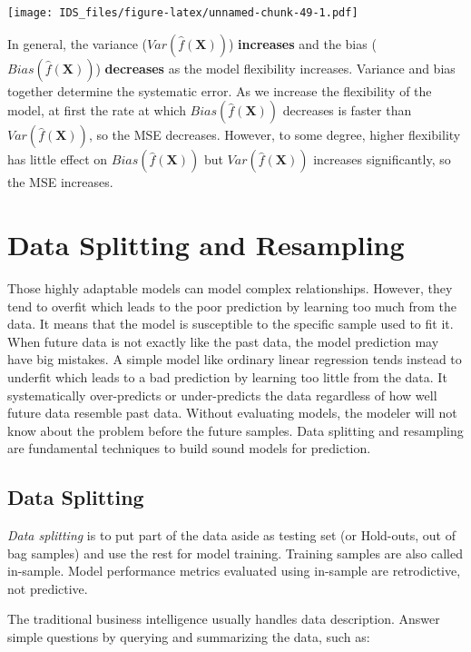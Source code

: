 \documentclass[
  12pt,
]{krantz}
\begin{document}
\texttt{[image: IDS\_files/figure-latex/unnamed-chunk-49-1.pdf]}

In general, the variance (\(Var(\hat{f}(\mathbf{X}))\)) \textbf{increases} and the bias (\(Bias(\hat{f}(\mathbf{X}))\)) \textbf{decreases} as the model flexibility increases. Variance and bias together determine the systematic error. As we increase the flexibility of the model, at first the rate at which \(Bias(\hat{f}(\mathbf{X}))\) decreases is faster than \(Var (\hat{f} (\mathbf{X}))\), so the MSE decreases. However, to some degree, higher flexibility has little effect on \(Bias(\hat{f}(\mathbf{X}))\) but \(Var(\hat{f} (\mathbf{X}))\) increases significantly, so the MSE increases.

\hypertarget{datasplittingresampling}{%
\section{Data Splitting and Resampling}\label{datasplittingresampling}}

Those highly adaptable models can model complex relationships. However, they tend to overfit which leads to the poor prediction by learning too much from the data. It means that the model is susceptible to the specific sample used to fit it. When future data is not exactly like the past data, the model prediction may have big mistakes. A simple model like ordinary linear regression tends instead to underfit which leads to a bad prediction by learning too little from the data. It systematically over-predicts or under-predicts the data regardless of how well future data resemble past data. Without evaluating models, the modeler will not know about the problem before the future samples. Data splitting and resampling are fundamental techniques to build sound models for prediction.

\hypertarget{datasplitting}{%
\subsection{Data Splitting}\label{datasplitting}}

\emph{Data splitting} is to put part of the data aside as testing set (or Hold-outs, out of bag samples) and use the rest for model training. Training samples are also called in-sample. Model performance metrics evaluated using in-sample are retrodictive, not predictive.

The traditional business intelligence usually handles data description. Answer simple questions by querying and summarizing the data, such as:
\end{document}
